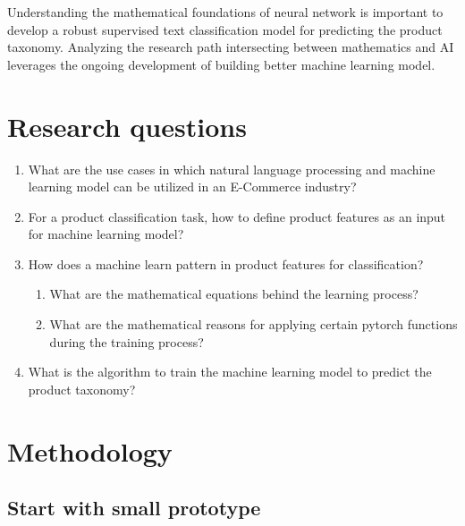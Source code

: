 Understanding the mathematical foundations of neural network is important to develop a robust supervised text classification model for predicting the product taxonomy. Analyzing the research path intersecting between mathematics and \acl{AI} leverages the ongoing development of building better machine learning model.  
\clearpage
\section{Research questions}

\begin{enumerate}[label=\textbf{RQ\arabic*:}]
    \item What are the use cases in which natural language processing and machine learning model can be utilized in an E-Commerce industry?
   
    
    \item For a product classification task, how to define product features as an input for machine learning model?
    
    \item How does a machine learn pattern in product features for classification?
    

    \begin{enumerate}[label=\textbf{SRQ\arabic*:}]
        \item What are the mathematical equations behind the learning process?
    
        
        \item What are the mathematical reasons for applying certain pytorch functions during the training process? 
        
         

    \end{enumerate}
    
    \item What is the algorithm to train the machine learning model to predict the product taxonomy?
  

  \end{enumerate}

\section{Methodology}

\subsection{Start with small prototype}

